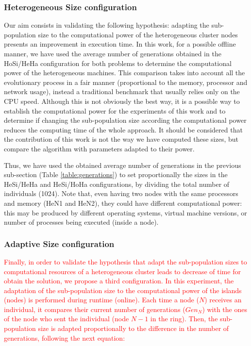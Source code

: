 \documentclass[final,1p,times]{elsarticle}
\begin{document}
\subsubsection{Heterogeneous Size configuration}

Our aim consists in validating the following hypothesis: adapting the sub-population size to the computational power of the heterogeneous cluster nodes presents an improvement in execution time. In this work, for a possible offline manner, we have used the average number of generations obtained in the HoSi/HeHa configuration for both problems to determine the computational power of the heterogeneous machines. This comparison takes into account all the evolutionary process in a fair manner (proportional to the memory, processor and network usage), instead a traditional benchmark that usually relies only on the CPU speed. Although this is not obviously the best way, it is a possible way to establish the computational power for the experiments of this work and to determine if changing the sub-population size according the computational power reduces the computing time of the whole approach. It should be considered that the contribution of this work is not the way we have computed these sizes, but compare the algorithm with parameters adapted to their power.

Thus, we have used the obtained average number of generations in the previous sub-section (Table \ref{table:generations}) to set proportionally the sizes in the HeSi/HeHa and HeSi/HoHa configurations, by dividing the total number of individuals (1024). Note that, even having two nodes with the same processors and memory (HeN1 and HeN2), they could have different computational power: this may be produced by different operating systems, virtual machine versions, or number of processes being executed (inside a node).



\subsubsection{Adaptive Size configuration}

\textcolor{red}{Finally, in order to validate the hypothesis that adapt the sub-population sizes to computational resources of a heterogeneous cluster leads to decrease of time for obtain the solution, we propose a third configuration. In this experiment, the adaptation of the sub-population size to the computational power of the islands (nodes) is performed during runtime (online).  Each time a node ($N$) receives an individual, it compares their current number of generations ($Gen_{N}$) with the ones of the node who sent the individual (node $N-1$ in the ring). Then, the sub-population size is adapted proportionally to the difference in the number of generations, following the next equation:}
\end{document}

